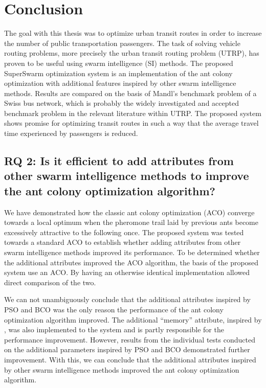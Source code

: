 \section{Conclusion}

The goal with this thesis was to optimize urban transit routes in order to increase the number of public transportation passengers. The task of solving vehicle routing problems, more precisely the urban transit routing problem (UTRP), has proven to be useful using swarm intelligence (SI) methods. The proposed SuperSwarm optimization system is an implementation of the ant colony optimization with additional features inspired by other swarm intelligence methods. Results are compared on the basis of Mandl's benchmark problem of a Swiss bus network, which is probably the widely investigated and accepted benchmark problem in the relevant literature within UTRP. The proposed system shows promise for optimizing transit routes in such a way that the average travel time experienced by passengers is reduced. 

\subsection*{RQ 2: Is it efficient to add attributes from other swarm intelligence methods to improve the ant colony optimization algorithm?}

We have demonstrated how the classic ant colony optimization (ACO) converge towards a local optimum when the pheromone trail laid by previous ants become excessively attractive to the following once. The proposed system was tested towards a standard ACO to establish whether adding attributes from other swarm intelligence methods improved its performance. To be determined whether the additional attributes improved the ACO algorithm, the basis of the proposed system use an ACO. By having an otherwise identical implementation allowed direct comparison of the two. %


We can not unambiguously conclude that the additional attributes inspired by PSO and BCO was the only reason the performance of the ant colony optimization algorithm improved. The additional ``memory'' attribute, inspired by \citet{dorigo96, sedighpour14, poorzahedy11, salehinejad10}, was also implemented to the system and is partly responsible for the performance improvement. However, results from the individual tests conducted on the additional parameters inspired by PSO and BCO demonstrated further improvement. With this, we can conclude that the additional attributes inspired by other swarm intelligence methods improved the ant colony optimization algorithm. 

